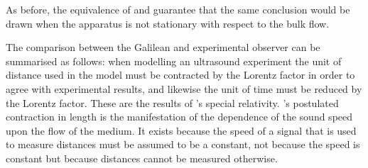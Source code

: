 
As before, the equivalence of  and  guarantee that the same conclusion 
would be drawn when the apparatus is not stationary with respect to the bulk flow.

The comparison between the Galilean and experimental observer can be summarised as follows:
when modelling an ultrasound experiment 
the  unit of distance used in the model must be
contracted by the Lorentz factor in order to agree with experimental results,
and likewise the unit of time must be reduced by the Lorentz factor.
These are the results of \Poincare's special relativity.
\Poincare's postulated contraction in length is the manifestation of the dependence of the sound speed upon
the flow of the medium.
It  exists because  the speed of a  signal that is used to measure distances must be assumed to be a constant,
not because the speed is constant but because distances cannot be measured otherwise.



%
%
%
%


